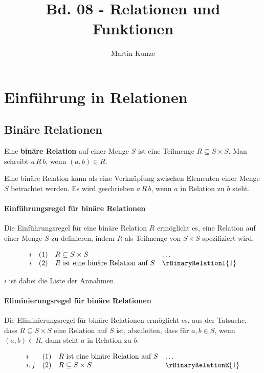 \documentclass[main.tex]{subfiles}
\title{Bd. 08 - Relationen und Funktionen}
\author{Martin Kunze}
\date{}
\begin{document}
\chapter{Einführung in Relationen}

\section{Binäre Relationen}

\begin{definition}
    Eine \textbf{binäre Relation} auf einer Menge \(S\) ist eine Teilmenge \(R \subseteq S \times S\). Man schreibt \(a \, R \, b\), wenn \((a,b) \in R\).
\end{definition}

\begin{remark}
    Eine binäre Relation kann als eine Verknüpfung zwischen Elementen einer Menge \(S\) betrachtet werden. Es wird geschrieben \(a \, R \, b\), wenn \(a\) in Relation zu \(b\) steht.
\end{remark}

\subsubsection*{Einführungsregel für binäre Relationen}
\label{rule:rBinaryRelationI}
Die Einführungsregel für eine binäre Relation \(R\) ermöglicht es, eine Relation auf einer Menge \(S\) zu definieren, indem \(R\) als Teilmenge von \(S \times S\) spezifiziert wird.

\[
\begin{array}{llll}
    i       & (1) & R \subseteq S \times S & \dots \\
    i       & (2) & R \text{ ist eine binäre Relation auf } S & \rBinaryRelationI{1}
\end{array}
\]

\(i\) ist dabei die Liste der Annahmen.

\subsubsection*{Eliminierungsregel für binäre Relationen}
\label{rule:rBinaryRelationE}
Die Eliminierungsregel für binäre Relationen ermöglicht es, aus der Tatsache, dass \(R \subseteq S \times S\) eine Relation auf \(S\) ist, abzuleiten, dass für \(a, b \in S\), wenn \((a,b) \in R\), dann steht \(a\) in Relation zu \(b\).

\[
\begin{array}{llll}
    i       & (1) & R \text{ ist eine binäre Relation auf } S & \dots \\
    i,j     & (2) & R \subseteq S \times S & \rBinaryRelationE{1}
\end{array}
\]
\end{document}
